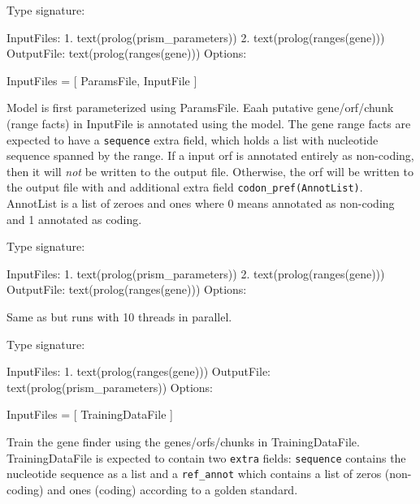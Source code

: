 \begin{description}
Type signature:

\begin{code}
InputFiles:
    1. text(prolog(prism_parameters))
    2. text(prolog(ranges(gene)))
OutputFile:
    text(prolog(ranges(gene)))
Options:
\end{code}

\begin{code}
InputFiles = [ ParamsFile, InputFile ]
\end{code}

Model is first parameterized using ParamsFile.
Eaah putative gene/orf/chunk (range facts) in InputFile is annotated using the model.
The gene range facts are expected to have a \verb$sequence$ extra field, which holds a list with nucleotide sequence spanned by the range.
If a input orf is annotated entirely as non-coding, then it will \textit{not} be written to the output file.
Otherwise, the orf will be written to the output file with and additional extra field \verb$codon_pref(AnnotList)$.
AnnotList is a list of zeroes and ones where 0 means annotated as non-coding and 1 annotated as coding.

Type signature:

\begin{code}
InputFiles:
    1. text(prolog(prism_parameters))
    2. text(prolog(ranges(gene)))
OutputFile:
    text(prolog(ranges(gene)))
Options:
\end{code}

Same as  but runs with 10 threads in parallel.

Type signature:

\begin{code}
InputFiles:
    1. text(prolog(ranges(gene)))
OutputFile:
    text(prolog(prism_parameters))
Options:
\end{code}

\begin{code}
InputFiles = [ TrainingDataFile ]
\end{code}

Train the gene finder using the genes/orfs/chunks in TrainingDataFile.
TrainingDataFile is expected to contain two \verb$extra$ fields: \verb$sequence$ contains the nucleotide sequence as a list and a \verb$ref_annot$ which contains a list of zeros (non-coding) and ones (coding) according to a golden standard.
\end{description}


